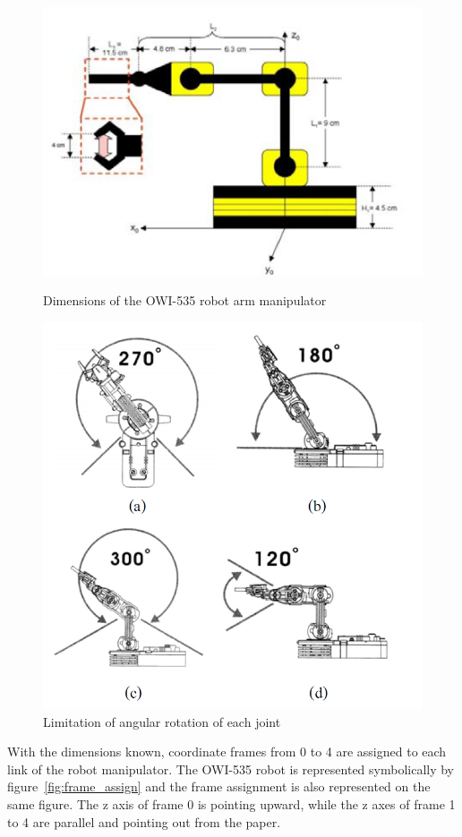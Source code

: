 \documentclass[paper=letter, fontsize=10pt]{scrartcl}	%
\numberwithin{equation}{section}															%
\numberwithin{figure}{section}																%
\numberwithin{table}{section}																%
\begin{document}
\begin{figure}[!h]
\RawFloats
\centering
  \begin{minipage}{.5\textwidth}
    \centering
    \includegraphics[width=.8\linewidth]{./Images/OWIDIM}
    \caption{Dimensions of the OWI-535 robot arm manipulator\cite{Pradya}}
    \label{fig:OWIDIM}
  \end{minipage}%
\begin{minipage}{.5\textwidth}
\centering
  \includegraphics[width=.8\linewidth]{./Images/OWI_LIMITS}
  \caption{Limitation of angular rotation of each joint\cite{Pradya}}
  \label{fig:OWI_LIMITS}
\end{minipage} 
\end{figure}


With the dimensions known, coordinate frames from 0 to 4 are assigned to each link of the robot manipulator. The OWI-535 robot is represented symbolically by figure~\ref{fig:frame_assign} and the frame assignment is also represented on the same figure. The z axis of frame 0 is pointing upward, while the z axes of frame 1 to 4 are parallel and pointing out from the paper. 
\end{document}
